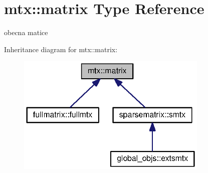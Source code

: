 \section{mtx\+:\+:matrix Type Reference}
\label{structmtx_1_1matrix}


obecna matice  




Inheritance diagram for mtx\+:\+:matrix\+:\nopagebreak
\begin{figure}[H]
\begin{center}
\leavevmode
\includegraphics[width=259pt]{structmtx_1_1matrix__inherit__graph}
\end{center}
\end{figure}
